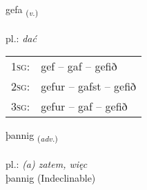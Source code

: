 \documentclass[frontgrid, backgrid]{flacards}\usepackage[]{graphicx}\usepackage[]{xcolor}
\begin{document}
\renewcommand{\flhead}{\vskip5pt \fboxsep=0pt {\small\bfseries\footnotesize Sagnorð | Verb}}
\renewcommand{\fcfoot}{\vskip5pt \fboxsep=0pt \hspace{2pt}{\small\bfseries\footnotesize 1K}}

\renewcommand{\blhead}{\vskip5pt {\small\bfseries\footnotesize Sagnorð | Verb }}
\renewcommand{\bcfoot}{\vskip5pt \hspace{2pt}{\small\bfseries\footnotesize 1K}}


{gefa \small{\textsubscript{(\textit{v.})}} \\[1ex] %
\textphonetic{[cɛːva]} \\
pl.: \emph{dać} \\  [2ex]
\renewcommand*{\arraystretch}{0.8}
\begin{tabular}{p{1cm}l}
\textsc{1sg}: & gef -- gaf -- gefið \\ 
\textsc{2sg}: & gefur -- gafst -- gefið \\ 
\textsc{3sg}: & gefur -- gaf -- gefið \\ 
\end{tabular}
}


\renewcommand{\flhead}{\vskip5pt \fboxsep=0pt {\small\bfseries\footnotesize Atviksorð | Adverb}}
\renewcommand{\fcfoot}{\vskip5pt \fboxsep=0pt \hspace{2pt}{\small\bfseries\footnotesize 1K}}

\renewcommand{\blhead}{\vskip5pt {\small\bfseries\footnotesize Atviksorð | Adverb }}
\renewcommand{\bcfoot}{\vskip5pt \hspace{2pt}{\small\bfseries\footnotesize 1K}}


{þannig \small{\textsubscript{(\textit{adv.})}} \\[1ex]
\textphonetic{[θanɪɣ]} \\
pl.: \emph{(a) zatem, więc} \\  [2ex]
þannig (Indeclinable)}

\renewcommand{\flhead}{\vskip5pt \fboxsep=0pt {\small\bfseries\footnotesize Sagnorð | Verb}}
\renewcommand{\fcfoot}{\vskip5pt \fboxsep=0pt \hspace{2pt}{\small\bfseries\footnotesize 1K}}
\end{document}
